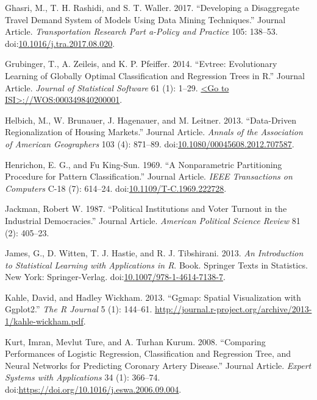 \documentclass[]{elsarticle} %
\begin{document}
\hypertarget{ref-Ghasri2017}{}
Ghasri, M., T. H. Rashidi, and S. T. Waller. 2017. ``Developing a
Disaggregate Travel Demand System of Models Using Data Mining
Techniques.'' Journal Article. \emph{Transportation Research Part
a-Policy and Practice} 105: 138--53.
doi:\href{https://doi.org/10.1016/j.tra.2017.08.020}{10.1016/j.tra.2017.08.020}.

\hypertarget{ref-Grubinger2014}{}
Grubinger, T., A. Zeileis, and K. P. Pfeiffer. 2014. ``Evtree:
Evolutionary Learning of Globally Optimal Classification and Regression
Trees in R.'' Journal Article. \emph{Journal of Statistical Software} 61
(1): 1--29.
\href{\%3CGo\%20to\%20ISI\%3E://WOS:000349840200001}{\textless{}Go to ISI\textgreater{}://WOS:000349840200001}.

\hypertarget{ref-Helbich2013}{}
Helbich, M., W. Brunauer, J. Hagenauer, and M. Leitner. 2013.
``Data-Driven Regionalization of Housing Markets.'' Journal Article.
\emph{Annals of the Association of American Geographers} 103 (4):
871--89.
doi:\href{https://doi.org/10.1080/00045608.2012.707587}{10.1080/00045608.2012.707587}.

\hypertarget{ref-Henrichon1969}{}
Henrichon, E. G., and Fu King-Sun. 1969. ``A Nonparametric Partitioning
Procedure for Pattern Classification.'' Journal Article. \emph{IEEE
Transactions on Computers} C-18 (7): 614--24.
doi:\href{https://doi.org/10.1109/T-C.1969.222728}{10.1109/T-C.1969.222728}.

\hypertarget{ref-Jackman1987}{}
Jackman, Robert W. 1987. ``Political Institutions and Voter Turnout in
the Industrial Democracies.'' Journal Article. \emph{American Political
Science Review} 81 (2): 405--23.

\hypertarget{ref-James2013}{}
James, G., D. Witten, T. J. Hastie, and R. J. Tibshirani. 2013. \emph{An
Introduction to Statistical Learning with Applications in R}. Book.
Springer Texts in Statistics. New York: Springer-Verlag.
doi:\href{https://doi.org/10.1007/978-1-4614-7138-7}{10.1007/978-1-4614-7138-7}.

\hypertarget{ref-Khale2013}{}
Kahle, David, and Hadley Wickham. 2013. ``Ggmap: Spatial Visualization
with Ggplot2.'' \emph{The R Journal} 5 (1): 144--61.
\url{http://journal.r-project.org/archive/2013-1/kahle-wickham.pdf}.

\hypertarget{ref-Kurt2008}{}
Kurt, Imran, Mevlut Ture, and A. Turhan Kurum. 2008. ``Comparing
Performances of Logistic Regression, Classification and Regression Tree,
and Neural Networks for Predicting Coronary Artery Disease.'' Journal
Article. \emph{Expert Systems with Applications} 34 (1): 366--74.
doi:\href{https://doi.org/https://doi.org/10.1016/j.eswa.2006.09.004}{https://doi.org/10.1016/j.eswa.2006.09.004}.
\end{document}
